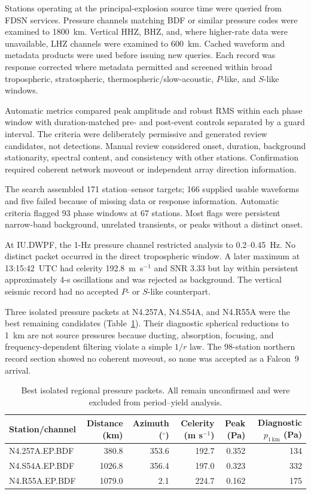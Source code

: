\documentclass[]{seismica}
\begin{document}
Stations operating at the principal-explosion source time were queried from
FDSN services. Pressure channels matching BDF or similar pressure codes were
examined to 1800~km. Vertical HHZ, BHZ, and, where higher-rate data were
unavailable, LHZ channels were examined to 600~km. Cached waveform and metadata
products were used before issuing new queries. Each record was response
corrected where metadata permitted and screened within broad tropospheric,
stratospheric, thermospheric/slow-acoustic, $P$-like, and $S$-like windows.

Automatic metrics compared peak amplitude and robust RMS within each phase
window with duration-matched pre- and post-event controls separated by a guard
interval. The criteria were deliberately permissive and generated review
candidates, not detections. Manual review considered onset, duration,
background stationarity, spectral content, and consistency with other
stations. Confirmation required coherent network moveout or independent array
direction information.

The search assembled 171 station--sensor targets; 166 supplied usable
waveforms and five failed because of missing data or response information.
Automatic criteria flagged 93 phase windows at 67 stations. Most flags were
persistent narrow-band background, unrelated transients, or peaks without a
distinct onset.

At IU.DWPF, the 1-Hz pressure channel restricted analysis to 0.2--0.45~Hz. No
distinct packet occurred in the direct tropospheric window. A later maximum at
13:15:42~UTC had celerity 192.8~m~s$^{-1}$ and SNR 3.33 but lay within
persistent approximately 4-s oscillations and was rejected as background. The
vertical seismic record had no accepted $P$- or $S$-like counterpart.

Three isolated pressure packets at N4.257A, N4.S54A, and N4.R55A were the best
remaining candidates (Table~\ref{tab:supp_regional_candidates}). Their
diagnostic spherical reductions to 1~km are not source pressures because
ducting, absorption, focusing, and frequency-dependent filtering violate a
simple $1/r$ law. The 98-station northern record section showed no coherent
moveout, so none was accepted as a Falcon~9 arrival.

\begin{table}[!tbp]
\centering
\caption{Best isolated regional pressure packets. All remain unconfirmed and
were excluded from period--yield analysis.}
\label{tab:supp_regional_candidates}
\begin{tabular}{lrrrrr}
\hline
Station/channel & Distance (km) & Azimuth ($^\circ$) & Celerity (m s$^{-1}$) & Peak (Pa) & Diagnostic $p_{1\,\mathrm{km}}$ (Pa) \\
\hline
N4.257A.EP.BDF & 380.8 & 353.6 & 192.7 & 0.352 & 134 \\
N4.S54A.EP.BDF & 1026.8 & 356.4 & 197.0 & 0.323 & 332 \\
N4.R55A.EP.BDF & 1079.0 & 2.1 & 224.7 & 0.162 & 175 \\
\hline
\end{tabular}
\end{table}
\end{document}
